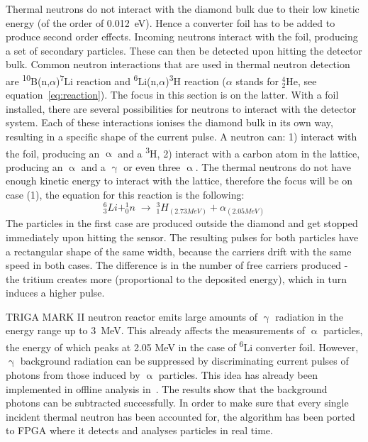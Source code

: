 Thermal neutrons do not interact with the diamond bulk due to their low kinetic energy (of the order of 0.012~eV). Hence a converter foil has to be added to produce second order effects. Incoming neutrons interact with the foil, producing a set of secondary particles. These can then be detected upon hitting the detector bulk. Common neutron interactions that are used in thermal neutron detection are \textsuperscript{10}B(n,$\alpha$)\textsuperscript{7}Li reaction and \textsuperscript{6}Li(n,$\alpha$)\textsuperscript{3}H reaction ($\alpha$ stands for $^4_2$He, see equation~\ref{eq:reaction}). The focus in this section is on the latter. With a foil installed, there are several possibilities for neutrons to interact with the detector system. Each of these interactions ionises the diamond bulk in its own way, resulting in a specific shape of the current pulse. A neutron can: 1) interact with the foil, producing an $\upalpha$ and a \textsuperscript{3}H, 2) interact with a carbon atom in the lattice, producing an $\upalpha$ and a $\upgamma$ or even three $\upalpha$. The thermal neutrons do not have enough kinetic energy to interact with the lattice, therefore the focus will be on case (1), the equation for this reaction is the following:
\begin{equation}
\label{eq:reaction}
   ^6_3Li   +   ^1_0n \;\rightarrow\; ^3_1H_{(2.73 MeV)} + \alpha_{(2.05 MeV)}
\end{equation}
The particles in the first case are produced outside the diamond and get stopped immediately upon hitting the sensor. The resulting pulses for both particles have a rectangular shape of the same width, because the carriers drift with the same speed in both cases. The difference is in the number of free carriers produced - the tritium creates more (proportional to the deposited energy), which in turn induces a higher pulse.

TRIGA MARK II neutron reactor emits large amounts of $\upgamma$ radiation in the energy range up to 3~MeV. This already affects the measurements of $\upalpha$ particles, the energy of which peaks at 2.05 MeV in the case of \textsuperscript{6}Li converter foil. However, $\upgamma$ background radiation can be suppressed by discriminating current pulses of photons from those induced by $\upalpha$ particles. This idea has already been implemented in offline analysis in~\cite{PAVEL:00000,PAVEL:00002}. The results show that the background photons can be subtracted successfully. In order to make sure that every single incident thermal neutron has been accounted for, the algorithm has been ported to FPGA where it detects and analyses particles in real time. 

